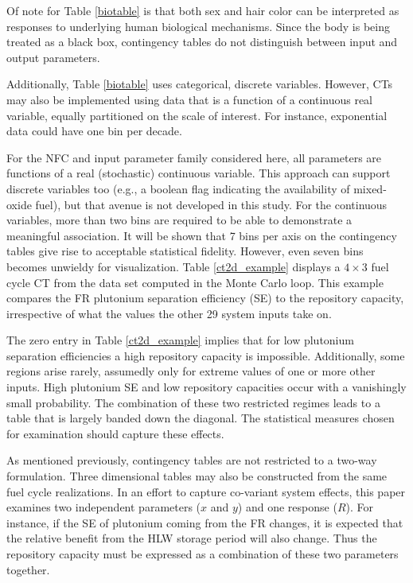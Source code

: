 Of note for Table \ref{biotable} is that both sex and hair color can be interpreted as responses to 
underlying human biological mechanisms.  Since the body is being treated as a black box, contingency 
tables do not distinguish between input and output parameters.

Additionally, Table \ref{biotable} uses categorical, discrete variables.  However, CTs may also be 
implemented using data that is a function of a continuous real variable, equally partitioned on the scale of
interest. For instance, exponential data could have one bin per decade.

For the NFC and input parameter family considered here, all parameters are functions of a real 
(stochastic) continuous variable.  This approach can support discrete variables too (e.g., a 
boolean flag indicating the availability of mixed-oxide fuel), but that avenue is not developed 
in this study. For the continuous variables, more than two bins are required to
be able to demonstrate a meaningful association.  It will be shown that 7 bins per axis on the 
contingency tables give rise to acceptable
statistical fidelity.  However, even seven bins becomes unwieldy for visualization.
Table \ref{ct2d_example} displays a $4\times 3$ fuel cycle CT from the data set computed in
the Monte Carlo loop.   This example compares the FR plutonium separation efficiency (SE) to the 
repository capacity, irrespective of what the values the other 29 system inputs take on.



The zero entry in Table \ref{ct2d_example} implies that for low plutonium separation efficiencies 
a high repository capacity is impossible.
Additionally, some regions arise rarely, assumedly only for extreme values of one or more other inputs.
High plutonium SE and low repository capacities occur with a vanishingly
small probability.  The combination of these two restricted regimes leads to a table that is 
largely banded down the diagonal.
The statistical measures chosen for examination should capture these effects.

As mentioned previously, contingency tables are not restricted to a two-way formulation.  
Three dimensional tables may also be constructed from the same
fuel cycle realizations.  In an effort to capture co-variant system effects, this paper 
examines two independent parameters ($x$ and $y$) and one response ($R$).  For instance, 
if the SE of plutonium coming from the FR changes, it is expected that the relative benefit 
from the HLW storage period will also change.
Thus the repository capacity must be expressed as a combination of these two parameters together.

